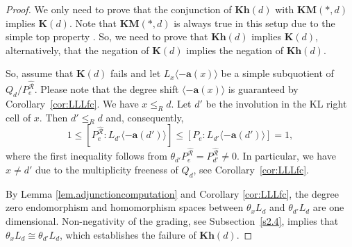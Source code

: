\documentclass[a4paper]{amsart}
\begin{document}
\begin{proof}
We only need to prove that 
the conjunction of $\mathbf{Kh}(d)$ with $\mathbf{KM}(*,d)$
implies $\mathbf{K}(d)$.
Note that $\mathbf{KM}(*,d)$ is always true in this setup due to 
the simple top property \cite[Theorem~4.11(iii)]{BS}.
So, we need to prove that $\mathbf{Kh}(d)$ implies
$\mathbf{K}(d)$, alternatively, that the negation of 
$\mathbf{K}(d)$ implies the negation of $\mathbf{Kh}(d)$.

So, assume that $\mathbf{K}(d)$ fails and let 
$L_x\langle -\mathbf{a}(x)\rangle$ be a simple subquotient
of $Q_d/P_e^{\hat{\mathcal{R}}}$. Please note that the
degree shift $\langle -\mathbf{a}(x)\rangle$ is guaranteed by Corollary~\ref{cor:LLLfc}.
We have $x\leq_R d$. Let $d'$ be the involution in the 
KL right cell of $x$. Then $d'\leq_R d$ and, consequently, 
\begin{displaymath}
1\leq [P_e^{\hat{\mathcal{R}}}:L_{d'}\langle -\mathbf{a}(d')\rangle]
\leq [P_e:L_{d'}\langle -\mathbf{a}(d')\rangle]=1, 
\end{displaymath}
where the first inequality follows from 
$\theta_{d'} P_e^{\hat{\mathcal{R}}}=P_{d'}^{\hat{\mathcal{R}}}\neq 0$.
In particular, we have $x\neq d'$ due to the multiplicity freeness
of $Q_d$, see Corollary~\ref{cor:LLLfc}.

By Lemma \ref{lem.adjunctioncomputation} and Corollary \ref{cor:LLLfc}, 
the degree zero endomorphism and homomorphism spaces between $\theta_xL_d$ 
and $\theta_{d'}L_d$ are one dimensional. Non-negativity of the grading,
see Subsection~\ref{s2.4},
implies that $\theta_xL_d\cong\theta_{d'}L_d$, which establishes the 
failure of $\mathbf{Kh}(d)$.

\end{proof}
\end{document}
